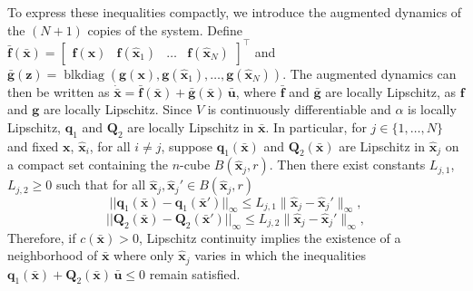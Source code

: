 To express these inequalities compactly, we introduce the augmented dynamics of the $(N+1)$ copies of the system. Define $\bar{\mathbf{f}}(\bar{\mathbf{x}}) = \begin{bmatrix} \mathbf{f}(\mathbf{x}) & \mathbf{f}(\hat{\mathbf{x}}_1) & \dots & \mathbf{f}(\hat{\mathbf{x}}_N) \end{bmatrix}^\top$ and $\bar{\mathbf{g}}(\mathbf{z}) = \operatorname{blkdiag} \left( \mathbf{g}(\mathbf{x}), \mathbf{g}(\hat{\mathbf{x}}_1), \dots, \mathbf{g}(\hat{\mathbf{x}}_N) \right)$.
The augmented dynamics can then be written as $\dot{\bar{\mathbf{x}}} = \bar{\mathbf{f}}(\bar{\mathbf{x}}) + \bar{\mathbf{g}}(\bar{\mathbf{x}}) \, \bar{\mathbf{u}}$, where $\bar{\mathbf{f}}$ and $\bar{\mathbf{g}}$ are locally Lipschitz, as $\mathbf{f}$ and $\mathbf{g}$ are locally Lipschitz. Since $V$ is continuously differentiable and $\alpha$ is locally Lipschitz, $\mathbf{q}_1$ and $\mathbf{Q}_2$ are locally Lipschitz in $\bar{\mathbf{x}}$. In particular, for $j \in \{1, \dots, N\}$ and fixed $\mathbf{x}$, $\hat{\mathbf{x}}_i$, for all $i \neq j$, suppose $\mathbf{q}_1(\bar{\mathbf{x}})$ and $\mathbf{Q}_2(\bar{\mathbf{x}})$ are Lipschitz in $\hat{\mathbf{x}}_j$ on a compact set containing the $n$-cube $B(\hat{\mathbf{x}}_j, r)$. Then there exist constants $L_{j, 1}$, $L_{j, 2} \ge 0$ such that for all $\hat{\mathbf{x}}_j,\hat{\mathbf{x}}_j' \in B(\hat{\mathbf{x}}_j, r)$
\[
    ||\mathbf{q}_1(\bar{\mathbf{x}}) - \mathbf{q}_1(\bar{\mathbf{x}}')||_\infty \le L_{j,1} \|\hat{\mathbf{x}}_j - \hat{\mathbf{x}}_j'\|_\infty,
\]
\[
    ||\mathbf{Q}_2(\bar{\mathbf{x}}) - \mathbf{Q}_2(\bar{\mathbf{x}}')||_\infty \le L_{j,2} \|\hat{\mathbf{x}}_j - \hat{\mathbf{x}}_j'\|_\infty,
\]
Therefore, if $c(\bar{\mathbf{x}}) > 0$, Lipschitz continuity implies the existence of a neighborhood of $\bar{\mathbf{x}}$ where only $\hat{\mathbf{x}}_j$ varies in which the inequalities $\mathbf{q}_1(\bar{\mathbf{x}}) + \mathbf{Q}_2(\bar{\mathbf{x}}) \, \bar{\mathbf{u}} \le 0$ remain satisfied. 

